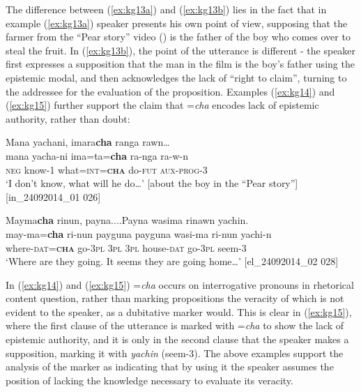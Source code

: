 \documentclass[output=paper]{langscibook}
\begin{document}
The difference between (\ref{ex:kg13a}) and (\ref{ex:kg13b}) lies in the fact that in example (‎\ref{ex:kg13a}) speaker presents his own point of view, supposing that the farmer from the “Pear story” video (\citealt{Chafe1980}) is the father of the boy who comes over to steal the fruit. In (\ref{ex:kg13b}), the point of the utterance is different - the speaker first expresses a supposition that the man in the film is the boy’s father using the epistemic modal, and then acknowledges the lack of “right to claim”, turning to the addressee for the evaluation of the proposition. Examples (\ref{ex:kg14}) and (\ref{ex:kg15}) further support the claim that =\textit{cha} encodes lack of epistemic authority, rather than doubt:

\begin{exe}
	\ex \label{ex:kg14}
	\glll Mana yachani, imara\textbf{cha} ranga rawn…\\
	mana yacha-ni ima=ta=\textbf{cha} ra-nga ra-w-n\\
	\textsc{neg}   know-1  what=\textsc{int}=\textbf{\textsc{cha}} do-\textsc{fut} \textsc{aux}-\textsc{prog}-3\\
	\trans ‘I don’t know, what will he do…’ [about the boy in the “Pear story”] [in\_24092014\_01 026]
\end{exe}

\begin{exe}
	\ex \label{ex:kg15}
	\glll Mayma\textbf{cha} rinun, payna....Payna wasima rinawn yachin.\\
	may-ma=\textbf{cha} ri-nun payguna  payguna wasi-ma ri-nun yachi-n\\
	where-\textsc{dat}=\textbf{\textsc{cha}}  go-3\textsc{pl} 3\textsc{pl} 3\textsc{pl} house-\textsc{dat}  go-3\textsc{pl}  seem-3\\
	\trans ‘Where are they going. It seems they are going home…’ [el\_24092014\_02 028]
\end{exe}

In (\ref{ex:kg14}) and (\ref{ex:kg15}) =\textit{cha} occurs on interrogative pronouns in rhetorical content question, rather than marking propositions the veracity of which is not evident to the speaker, as a dubitative marker would. This is clear in (\ref{ex:kg15}), where the first clause of the utterance is marked with =\textit{cha} to show the lack of epistemic authority, and it is only in the second clause that the speaker makes a supposition, marking it with \textit{yachin} (seem-3). The above examples support the analysis of the marker as indicating that by using it the speaker assumes the position of lacking the knowledge necessary to evaluate its veracity.
\end{document}
